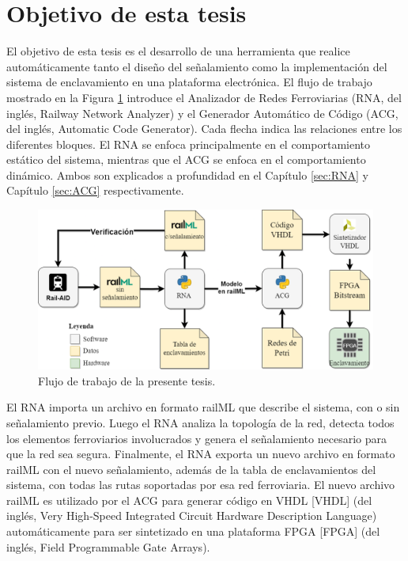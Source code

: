\section{Objetivo de esta tesis}

    El objetivo de esta tesis es el desarrollo de una herramienta que realice automáticamente tanto el diseño del señalamiento como la implementación del sistema de enclavamiento en una plataforma electrónica. El flujo de trabajo mostrado en la Figura \ref{fig:workflow} introduce el Analizador de Redes Ferroviarias (RNA, del inglés, Railway Network Analyzer) y el Generador Automático de Código (ACG, del inglés, Automatic Code Generator). Cada flecha indica las relaciones entre los diferentes bloques. El RNA se enfoca principalmente en el comportamiento estático del sistema, mientras que el ACG se enfoca en el comportamiento dinámico. Ambos son explicados a profundidad en el Capítulo \ref{sec:RNA} y Capítulo \ref{sec:ACG} respectivamente.

    \begin{figure}[h]
        \centering
        \includegraphics[width=1\textwidth]{Figuras/workflow.png}
        \centering\caption{Flujo de trabajo de la presente tesis.}
        \label{fig:workflow}
    \end{figure}

    El RNA importa un archivo en formato railML que describe el sistema, con o sin señalamiento previo. Luego el RNA analiza la topología de la red, detecta todos los elementos ferroviarios involucrados y genera el señalamiento necesario para que la red sea segura. Finalmente, el RNA exporta un nuevo archivo en formato railML con el nuevo señalamiento, además de la tabla de enclavamientos del sistema, con todas las rutas soportadas por esa red ferroviaria. El nuevo archivo railML es utilizado por el ACG para generar código en VHDL [VHDL] (del inglés, Very High-Speed Integrated Circuit Hardware Description Language) automáticamente para ser sintetizado en una plataforma FPGA [FPGA] (del inglés, Field Programmable Gate Arrays).
    
